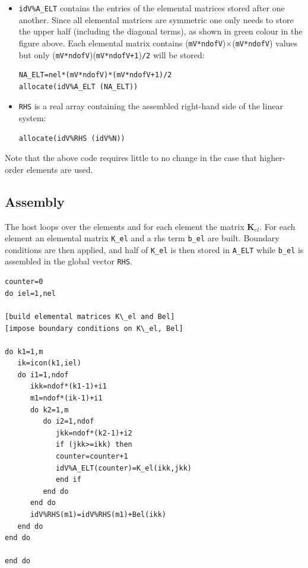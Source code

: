 \begin{itemize}
\item {\tt idV\%A\_ELT} contains the entries of the elemental matrices stored after one another. Since  
all elemental matrices are symmetric one only needs to store the upper half (including the diagonal terms), 
as shown in green colour in the figure above.
Each elemental matrix contains ({\tt mV*ndofV})$\times$({\tt mV*ndofV}) values but only 
({\tt mV*ndofV})({\tt mV*ndofV+1}){\tt /2} will be stored:
\begin{verbatim}
NA_ELT=nel*(mV*ndofV)*(mV*ndofV+1)/2 
allocate(idV%A_ELT (NA_ELT))
\end{verbatim}

\item {\tt RHS} is a real array containing the assembled right-hand side of the linear system:
\begin{verbatim}
allocate(idV%RHS (idV%N))
\end{verbatim}

\end{itemize}

Note that the above code requires little to no change in the case that higher-order elements are used. 

\subsection{Assembly}

The host loops over the elements and for each element
the matrix ${\bm K}_{el}$. 
 For each element an elemental matrix {\tt K\_el} and a rhs term {\tt b\_el}
are built. Boundary conditions are then applied, 
and half of {\tt K\_el} is then stored in {\tt A\_ELT} while 
{\tt b\_el} is assembled in the global vector {\tt RHS}.

\begin{verbatim}
counter=0
do iel=1,nel

[build elemental matrices K\_el and Bel]
[impose boundary conditions on K\_el, Bel]

do k1=1,m
   ik=icon(k1,iel)
   do i1=1,ndof
      ikk=ndof*(k1-1)+i1
      m1=ndof*(ik-1)+i1
      do k2=1,m
         do i2=1,ndof
            jkk=ndof*(k2-1)+i2
            if (jkk>=ikk) then
            counter=counter+1
            idV%A_ELT(counter)=K_el(ikk,jkk)
            end if
         end do
      end do
      idV%RHS(m1)=idV%RHS(m1)+Bel(ikk)
   end do
end do

end do
\end{verbatim}




